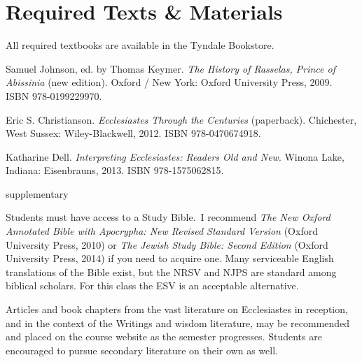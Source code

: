 \documentclass[titlepage]{article}
\newcommand\incl{../includes}
\begin{document}


\section{Required Texts \& Materials}
\label{texts}

All required textbooks are available in the Tyndale Bookstore.

\begingroup
\renewcommand{\section}[2]{}%
\begin{thebibliography}{Christianson}%

	 Samuel Johnson, ed. by Thomas Keymer.
	\emph{The History of Rasselas, Prince of Abissinia} (new edition).
	Oxford / New York: Oxford University Press, 2009.
	ISBN 978-0199229970.

	 Eric S. Christianson.
    \emph{Ecclesiastes Through the Centuries} (paperback).
    Chichester, West Sussex: Wiley-Blackwell, 2012.
	ISBN 978-0470674918.

	 Katharine Dell.
	\emph{Interpreting Ecclesiastes: Readers Old and New}.
	Winona Lake, Indiana: Eisenbrauns, 2013.
	ISBN 978-1575062815.

\end{thebibliography}
\endgroup

\section{Supplementary Texts}
\label{supplementary}

Students must have access to a Study Bible. I recommend \emph{The New
Oxford Annotated Bible with Apocrypha: New Revised Standard Version}
(Oxford University Press, 2010) or \emph{The Jewish Study Bible: Second
Edition} (Oxford University Press, 2014) if you need to acquire one.
Many serviceable English translations of the Bible exist, but the NRSV
and NJPS are standard among biblical scholars. For this class the ESV is
an acceptable alternative.

Articles and book chapters from the vast literature on Ecclesiastes in
reception, and in the context of the Writings and wisdom literature, may
be recommended and placed on the course website as the semester
progresses. Students are encouraged to pursue secondary literature on
their own as well.
\end{document}
